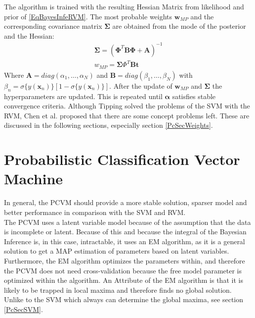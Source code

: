 The algorithm is trained with the resulting Hessian Matrix from likelihood and prior of \ref{EqBayesInfeRVM}.
The most probable weights $\mathbf{w}_{MP}$ and the corresponding covariance matrix $\boldsymbol{\Sigma}$ are obtained from the mode of the posterior and the Hessian:
\begin{equation}
\begin{split}
\boldsymbol{\Sigma} = (\boldsymbol{\Phi}^T\mathbf{B}\boldsymbol{\Phi} + \mathbf{A})^{-1}\\
w_{MP}=\boldsymbol{\Sigma}\Phi^T\mathbf{B}\mathbf{t} 
\end{split}
\end{equation}
Where $\mathbf{A} = diag(\alpha_1,\dots,\alpha_N)$ and $\mathbf{B} = diag(\beta_1,\dots,\beta_N)$ with $\beta_n =\sigma\{y(\mathbf{x}_n)\}[1-\sigma\{y(\mathbf{x}_n)\}]$.
After the update of $\mathbf{w}_{MP}$ and $\boldsymbol{\Sigma}$ the hyperparameters are updated.
This is repeated until $\boldsymbol{\alpha}$ satisfies stable convergence criteria.\cite[p. 219]{Tipping.2001}\newline
Although Tipping solved the problems of the \ac{SVM} with the \ac{RVM}, Chen et al. proposed that there are some concept problems left.\cite{Chen.2009}
These are discussed in the following sections, especially section \ref{PcSecWeights}.
\section{Probabilistic Classification Vector Machine}\label{PcSecAdvan}
In general, the \acf{PCVM} should provide a more stable solution, sparser model and better performance in comparison with the \acs{SVM} and \acs{RVM}.\cite{Chen.2009}\\
The \ac{PCVM} uses a latent variable model because of the assumption that the data is incomplete or latent.
Because of this and because the integral of the Bayesian Inference is, in this case, intractable, it uses an \ac{EM} algorithm, as it is a general solution to get a \ac{MAP} estimation of parameters based on latent variables.
Furthermore, the \acs{EM} algorithm optimizes the parameters within, and therefore the \ac{PCVM} does not need cross-validation because the free model parameter is optimized within the algorithm.\cite{Chen.2009}\newline
An Attribute of the \acs{EM} algorithm is that it is likely to be trapped in local maxima and therefore finds no global solution.\cite{YiWang.2006}
Unlike to the \acs{SVM} which always can determine the global maxima, see section \ref{PcSecSVM}.\newline

